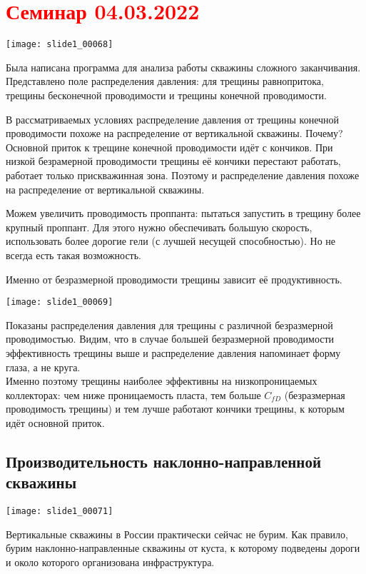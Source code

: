 \documentclass[main.tex]{subfiles}
\begin{document}
\section{\textcolor{red}{Семинар 04.03.2022}}

\texttt{[image: slide1\_00068]}

Была написана программа для анализа работы скважины сложного заканчивания. Представлено поле распределения давления: для трещины равнопритока, трещины бесконечной проводимости и трещины конечной проводимости.

В рассматриваемых условиях распределение давления от трещины конечной проводимости похоже на распределение от вертикальной скважины. Почему?\\

Основной приток к трещине конечной проводимости идёт с кончиков. При низкой безрамерной проводимости трещины её кончики перестают работать, работает только прискважинная зона. Поэтому и распределение давления похоже на распределение от вертикальной скважины.

Можем увеличить проводимость проппанта: пытаться запустить в трещину более крупный проппант. Для этого нужно обеспечивать большую скорость, использовать более дорогие гели (с лучшей несущей способностью). Но не всегда есть такая возможность.

Именно от безразмерной проводимости трещины зависит её продуктивность.

\texttt{[image: slide1\_00069]}

Показаны распределения давления для трещины с различной безразмерной проводимостью. Видим, что в случае большей безразмерной проводимости эффективность трещины выше и распределение давления напоминает форму глаза, а не круга.\\

Именно поэтому трещины наиболее эффективны на низкопроницаемых коллекторах: чем ниже проницаемость пласта, тем больше $C_{fD}$ (безразмерная проводимость трещины) и тем лучше работают кончики трещины, к которым идёт основной приток.

\subsection{Производительность наклонно-направленной скважины}

\texttt{[image: slide1\_00071]}

Вертикальные скважины в России практически сейчас не бурим. Как правило, бурим наклонно-направленные скважины от куста, к которому подведены дороги и около которого организована инфраструктура.
\end{document}
